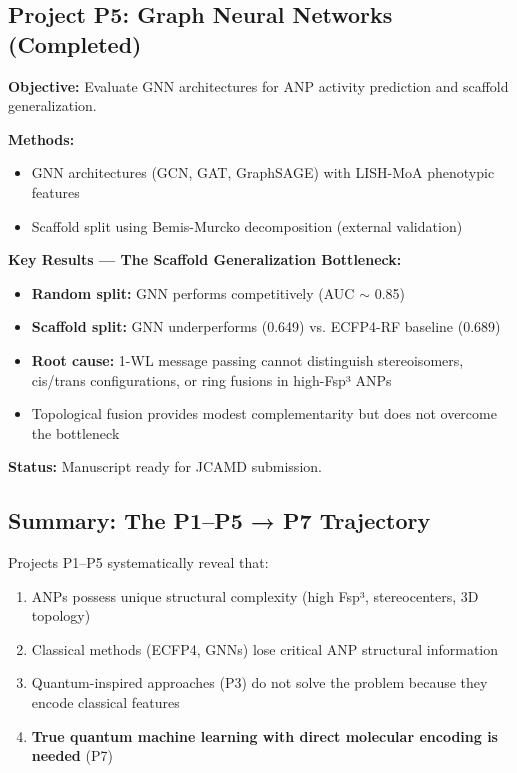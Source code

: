 \documentclass[11pt,a4paper]{article}
\begin{document}
\subsection{Project P5: Graph Neural Networks (Completed)}

\textbf{Objective:} Evaluate GNN architectures for ANP activity prediction and scaffold generalization.

\textbf{Methods:}
\begin{itemize}
    \item GNN architectures (GCN, GAT, GraphSAGE) with LISH-MoA phenotypic features
    \item Scaffold split using Bemis-Murcko decomposition (external validation)
\end{itemize}

\textbf{Key Results — The Scaffold Generalization Bottleneck:}
\begin{itemize}
    \item \textbf{Random split:} GNN performs competitively (AUC $\sim$ 0.85)
    \item \textbf{Scaffold split:} GNN underperforms (0.649) vs. ECFP4-RF baseline (0.689)
    \item \textbf{Root cause:} 1-WL message passing cannot distinguish stereoisomers, cis/trans configurations, or ring fusions in high-Fsp³ ANPs
    \item Topological fusion provides modest complementarity but does not overcome the bottleneck
\end{itemize}

\textbf{Status:} Manuscript ready for JCAMD submission.

\subsection{Summary: The P1--P5 → P7 Trajectory}

Projects P1--P5 systematically reveal that:
\begin{enumerate}
    \item ANPs possess unique structural complexity (high Fsp³, stereocenters, 3D topology)
    \item Classical methods (ECFP4, GNNs) lose critical ANP structural information
    \item Quantum-inspired approaches (P3) do not solve the problem because they encode classical features
    \item \textbf{True quantum machine learning with direct molecular encoding is needed} (P7)
\end{enumerate}
\end{document}
